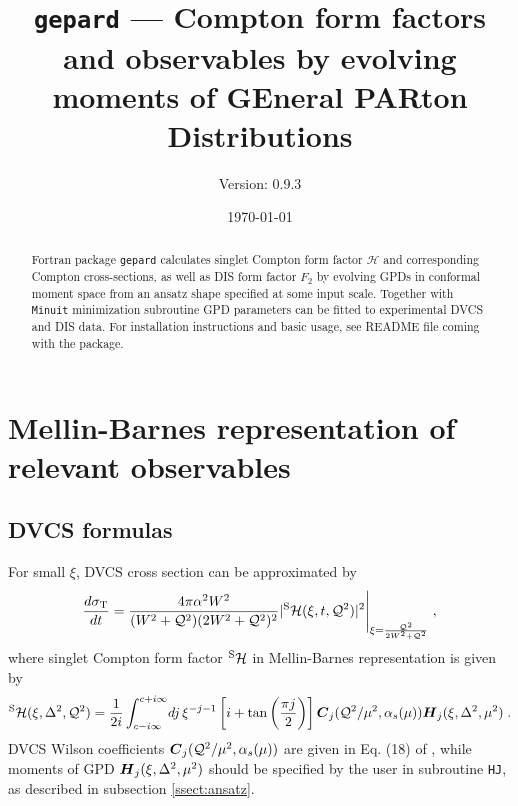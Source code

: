 \documentclass[12pt]{article}
\begin{document}
\title{\texttt{gepard} --- Compton form factors and observables
                            by evolving moments of GEneral PARton Distributions}
\author{Version: 0.9.3}
\date{\today}
\maketitle

\begin{abstract}
Fortran package \texttt{gepard} calculates singlet Compton form factor
$\mathcal{H}$ and corresponding Compton cross-sections, as well as
DIS form factor $F_2$ by evolving GPDs in conformal moment space from an ansatz shape
specified at some input scale.  Together
with \texttt{Minuit} minimization subroutine GPD parameters can be fitted to
experimental DVCS and DIS data. For installation instructions and
basic usage, see README file coming with the package.
\end{abstract}

\tableofcontents
\clearpage

\section{Mellin-Barnes representation of relevant observables}

\subsection{DVCS formulas}  

For small $\xi$, DVCS cross section can be approximated by 
\begin{equation}
\frac{d \sigma_{\rm T}}{d t} = \frac{4 \pi \alpha^2 W^2}{(W^2 + \mathcal{Q}^2)
(2 W^2 + \mathcal{Q}^2)^2} | ^{\rm S}\mathcal{H}(\xi, t, \mathcal{Q}^2)|^2 \Bigg|_{\xi
= \frac{\mathcal{Q}^2}{2 W^2 + \mathcal{Q}^2}} \;,
\label{eq:parsigma}
\end{equation}
where singlet Compton form factor $^{\rm S}\mathcal{H}$ in Mellin-Barnes representation is given by
\begin{equation}
{^{\rm S}{\cal H}}(\xi,\Delta^2,{\cal Q}^2)
= \frac{1}{2i}\int_{c-i \infty}^{c+ i \infty}\!
dj\,\xi^{-j-1} \left[i + \tan \left(\frac{\pi j}{2}\right) \right]
\mbox{\boldmath $C$}_{j}({\cal Q}^2/\mu^2,\alpha_s(\mu)) 
\mbox{\boldmath $H$}_{j} (\xi,\Delta^2,\mu^2) \;.
\label{eq:CFF}
\end{equation}
DVCS Wilson coefficients $\mbox{\boldmath $C$}_{j}({\cal Q}^2/\mu^2,\alpha_s(\mu))$
are given in Eq. (18) of \cite{Kumericki:2006xx}, while moments of
GPD $\mbox{\boldmath $H$}_{j} (\xi,\Delta^2,\mu^2)$ should be specified
by the user in subroutine \texttt{HJ}, as described in subsection \ref{ssect:ansatz}.
\end{document}
